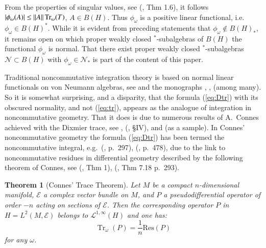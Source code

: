 \documentclass[final,1p]{elsarticle}
\numberwithin{equation}{section}
\theoremstyle{plain}
\newtheorem{thm}{Theorem}[section]
\theoremstyle{definition}
\newcounter{prop2count}
\begin{document}
From the properties of singular values, see (\cite{S}, Thm 1.6),
it follows $|\phi_\omega(A)| \leq {\mbox{\ensuremath{\| {A} \|}}} \operatorname{Tr}_\omega(T)$, $A \in B(H)$.  Thus $\phi_\omega$ is a positive linear functional, i.e.~$\phi_\omega \in B(H)^*$.  While it is evident from preceding statements that $\phi_\omega \not\in B(H)_*$, it remains open on which proper weakly closed $^*$-subalgebras of $B(H)$ the functional $\phi_\omega$ is normal.
That there exist proper weakly closed $^*$-subalgebras $\mathcal{N} \subset B(H)$ with $\phi_\omega \in \mathcal{N}_*$ is part of the content of this paper.

Traditional noncommutative integration theory is based on normal linear functionals on von Neumann algebras, see \cite{Se2} and the monographs \cite{BR}, \cite{Ped}, \cite{T} (among many).  So it is somewhat surprising, and a disparity, that the formula (\ref{eq:Dtr}) with its obscured normality, and not (\ref{eq:tr}), appears as the analogue of integration in noncommutative geometry.  That it does is due to numerous results of
A.~Connes achieved with the Dixmier trace, see \cite{C3}, (\cite{CN}, \S IV), and \cite{CM} (as a sample).  In Connes' noncommutative geometry the formula (\ref{eq:Dtr}) has been termed the noncommutative integral, e.g.~(\cite{GBVF}, p.~297), (\cite{Hawk}, p.~478), due to the link to noncommutative residues in differential geometry described by the following theorem of Connes, see
(\cite{C3}, Thm 1), (\cite{GBVF}, Thm 7.18 p.~293).

\begin{thm}[Connes' Trace Theorem] \label{thm:2}
Let $M$ be a compact $n$-dimensional manifold, $\mathcal{E}$ a complex vector bundle
on $M$, and $P$ a pseudodifferential operator of order $-n$ acting on sections of $\mathcal{E}$. Then the corresponding operator $P$ in $H=L^2(M, \mathcal{E})$ belongs to $\mathcal{L}^{1,\infty}(H)$ and one has:
$$
\operatorname{Tr}_\omega(P) =  \frac{1}{n} \mathrm{Res}(P)
$$
for any $\omega$.
\end{thm}
\end{document}
